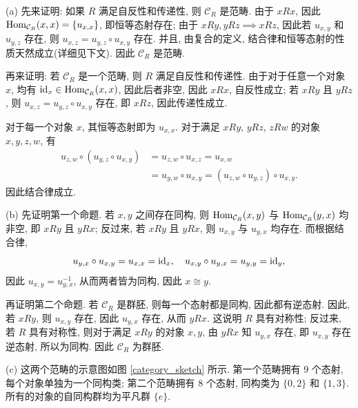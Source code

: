 \documentclass{article}
\begin{document}
\begin{solution}
	(a) 先来证明: 如果 $R$ 满足自反性和传递性, 则 $\mathcal{C}_R$ 是范畴. 由于 $xRx$, 因此 $\operatorname{Hom}_{\mathcal{C}_R}(x,x) = \{u_{x,x}\}$, 即恒等态射存在; 由于 $xRy, yRz \implies xRz$, 因此若 $u_{x,y}$ 和 $u_{y,z}$ 存在, 则 $u_{x,z} = u_{y,z} \circ u_{x,y}$ 存在. 并且, 由复合的定义, 结合律和恒等态射的性质天然成立(详细见下文). 因此 $\mathcal{C}_R$ 是范畴.

	再来证明: 若 $\mathcal{C}_R$ 是一个范畴, 则 $R$ 满足自反性和传递性. 由于对于任意一个对象 $x$, 均有 $\operatorname{id}_x \in \operatorname{Hom}_{\mathcal{C}_R}(x,x)$, 因此后者非空, 因此 $xRx$, 自反性成立; 若 $xRy$ 且 $yRz$, 则 $u_{x,z} = u_{y,z} \circ u_{x,y}$ 存在, 即 $xRz$, 因此传递性成立.

	对于每一个对象 $x$, 其恒等态射即为 $u_{x,x}$. 对于满足 $xRy$, $yRz$, $zRw$ 的对象 $x,y,z,w$, 有
	\begin{align*}
		u_{z,w} \circ (u_{y,z} \circ u_{x,y})
		&= u_{z,w} \circ u_{x,z}
		= u_{x,w} \\
		&= u_{y,w} \circ u_{x,y}
		=(u_{z,w} \circ u_{y,z}) \circ u_{x,y}.
	\end{align*}
	因此结合律成立.

	(b) 先证明第一个命题. 若 $x,y$ 之间存在同构, 则 $\operatorname{Hom}_{\mathcal{C}_R}(x,y)$ 与 $\operatorname{Hom}_{\mathcal{C}_R}(y,x)$ 均非空, 即 $xRy$ 且 $yRx$; 反过来, 若 $xRy$ 且 $yRx$, 则 $u_{x,y}$ 与 $u_{y,x}$ 均存在. 而根据结合律, 	\[ u_{y,x} \circ u_{x,y} = u_{x,x} = \operatorname{id}_x,\quad 
	u_{x,y} \circ u_{y,x} = u_{y,y} = \operatorname{id}_y, \]
	因此 $u_{x,y} = u_{y,x}^{-1}$, 从而两者皆为同构, 因此 $x \cong y$.

	再证明第二个命题. 若 $\mathcal{C}_R$ 是群胚, 则每一个态射都是同构, 因此都有逆态射. 因此, 若 $xRy$, 则 $u_{x,y}$ 存在, 因此 $u_{y,x}$ 存在, 从而 $yRx$. 这说明 $R$ 具有对称性; 反过来, 若 $R$ 具有对称性, 则对于满足 $xRy$ 的对象 $x,y$, 由 $yRx$ 知 $u_{y,x}$ 存在, 即 $u_{x,y}$ 存在逆态射, 所以为同构. 因此 $\mathcal{C}_R$ 为群胚.

	(c) 这两个范畴的示意图如图 \ref{category_sketch} 所示. 第一个范畴拥有 $9$ 个态射, 每个对象单独为一个同构类; 第二个范畴拥有 $8$ 个态射, 同构类为 $\{0,2\}$ 和 $\{1,3\}$. 所有的对象的自同构群均为平凡群 $\{e\}$.
	\begin{figure}[htbp]
		\centering
\end{figure}
\end{solution}
\end{document}

